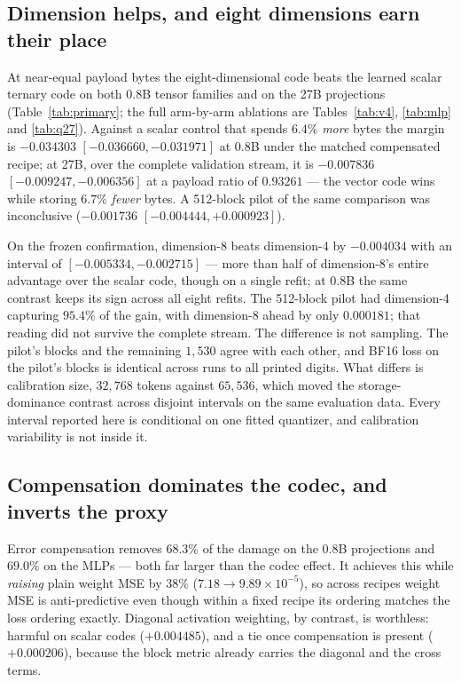 \documentclass[11pt]{article}
\begin{document}
\subsection{Dimension helps, and eight dimensions earn their place}

At near-equal payload bytes the eight-dimensional code beats the learned scalar
ternary code on both 0.8B tensor families and on the 27B projections
(Table~\ref{tab:primary}; the full arm-by-arm ablations are
Tables~\ref{tab:v4}, \ref{tab:mlp} and \ref{tab:q27}). Against a scalar control that spends $6.4\%$
\emph{more} bytes the margin is $-0.034303$ $[-0.036660,-0.031971]$ at 0.8B
under the matched compensated recipe; at 27B, over the complete validation
stream, it is $-0.007836$ $[-0.009247,-0.006356]$ at a payload ratio of
$0.93261$ --- the vector code wins while storing $6.7\%$ \emph{fewer} bytes. A
512-block pilot of the same comparison was inconclusive
($-0.001736$ $[-0.004444,+0.000923]$).

On the frozen confirmation, dimension-8 beats dimension-4 by $-0.004034$ with
an interval of $[-0.005334,-0.002715]$ --- more than half of dimension-8's entire advantage
over the scalar code, though on a single refit; at 0.8B the same contrast keeps
its sign across all eight refits. The 512-block pilot had dimension-4 capturing
$95.4\%$ of the gain, with dimension-8 ahead by only $0.000181$; that reading
did not survive the complete stream. The difference is not sampling. The pilot's blocks
and the remaining $1{,}530$ agree with each other, and BF16 loss on the
pilot's blocks is identical across runs to all printed digits. What differs
is calibration size, $32{,}768$ tokens against $65{,}536$, which moved the
storage-dominance contrast across disjoint intervals on the same evaluation
data. Every interval reported here is conditional on one fitted
quantizer, and calibration variability is not inside it.

\subsection{Compensation dominates the codec, and inverts the proxy}

Error compensation removes $68.3\%$ of the damage on the 0.8B projections and
$69.0\%$ on the MLPs --- both far larger than the codec effect. It achieves this
while \emph{raising} plain weight MSE by $38\%$
($7.18\to9.89\times10^{-5}$), so across recipes weight MSE is anti-predictive
even though within a fixed recipe its ordering matches the loss ordering
exactly. Diagonal activation weighting, by contrast, is worthless: harmful on
scalar codes ($+0.004485$), and a tie once compensation is present
($+0.000206$), because the block metric already carries the diagonal and the
cross terms.
\end{document}
